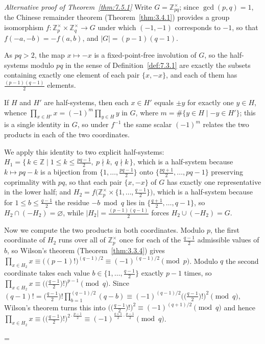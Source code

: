 \documentclass[11pt]{article}
\makeatletter
\theoremstyle{ntstyle}
\let\nt@closedisplay\]
\def\nt@guardedclose{\@ifnextchar\par{\nt@closeafterpar}{\@ifnextchar\end{\postdisplaypenalty\@M\nt@closedisplay}{\nt@closedisplay}}}
\def\nt@closeafterpar\par{\@ifnextchar\par{\nt@closeafterpar}{\@ifnextchar\end{\postdisplaypenalty\@M\nt@closedisplay\par}{\nt@closedisplay\par}}}
\renewenvironment{proof}[1][\proofname]{\par
  \pushQED{\qed}\normalfont\topsep\medskipamount\edef\nt@afterproof{\@endparpenalty=\the\@endparpenalty\relax}\@beginparpenalty\@M\@endparpenalty\@M\let\]\nt@guardedclose\trivlist\item[]\textit{#1\@addpunct{.}} \ignorespaces}{\ifvmode\addpenalty\@M\fi\popQED\nt@afterproof\endtrivlist\@endpefalse}
\newenvironment{altproof}[1][\proofname]{\begin{proof}[#1]\renewcommand{\qedsymbol}{}}{\end{proof}}
\newcommand{\ZmodUnits}[1]{\mathbb{Z}_{#1}^{\times}}
\makeatother
\begin{document}
\begin{altproof}[Alternative proof of Theorem~\ref{thm:7.5.1}] Write $G = \ZmodUnits{pq}$; since $\gcd(p, q)
		= 1$, the Chinese remainder theorem (Theorem~\ref{thm:3.4.1}) provides a group
	isomorphism $f : \ZmodUnits{p} \times \ZmodUnits{q}
		\to G$ under which $(-1, -1)$ corresponds to $-1$, so that $f(-a, -b)
		= -f(a, b)$, and $|G| = (p-1)(q-1)$.

	As $pq > 2$, the map $x \mapsto
		-x$ is a fixed-point-free involution of $G$, so the half-systems modulo
	$pq$ in the sense of Definition~\ref{def:7.3.1} are exactly the subsets containing
	exactly one element of each pair $\{x, -x\}$, and each of them has
	$\tfrac{(p-1)(q-1)}{2}$ elements.

	If $H$ and $H'$
	are half-systems, then each $x \in H'$ equals $\pm y$ for exactly one
	$y \in H$, whence $\prod_{x \in H'} x = (-1)^{m} \prod_{y \in H} y$ in
	$G$, where $m = \#\{y \in H \mid -y \in H'\}$; this is a single
	identity in $G$, so under $f^{-1}$ the same scalar $(-1)^{m}$ relates
	the two products in each of the two coordinates.

	We apply this identity to two explicit
	half-systems: $H_1 = \{\, k \in \mathbb{Z} \mid 1 \le k \le
		\tfrac{pq-1}{2},\ p \nmid k,\ q \nmid k \,\}$, which is a half-system
	because $k \mapsto pq - k$ is a bijection from $\{1, \ldots,
		\tfrac{pq-1}{2}\}$ onto $\{\tfrac{pq+1}{2}, \ldots, pq-1\}$
	preserving coprimality with $pq$, so that each pair $\{x, -x\}$ of $G$
	has exactly one representative in the lower half; and $H_2 =
		f\big(\ZmodUnits{p} \times \{1, \ldots,
		\tfrac{q-1}{2}\}\big)$, which is a half-system because for $1 \le b
		\le \tfrac{q-1}{2}$ the residue $-b \bmod q$ lies in
	$\{\tfrac{q+1}{2}, \ldots, q-1\}$, so $H_2 \cap (-H_2) = \varnothing$,
	while $|H_2| = \tfrac{(p-1)(q-1)}{2}$ forces $H_2 \cup (-H_2) = G$.

	Now we compute the two products in both coordinates. Modulo $p$, the
	first coordinate of $H_2$ runs over all of $\ZmodUnits{p}$
	once for each of the $\tfrac{q-1}{2}$ admissible values of $b$, so
	Wilson's theorem (Theorem~\ref{thm:3.3.4}) gives $\prod_{x \in H_2} x \equiv
		\big((p-1)!\big)^{(q-1)/2} \equiv (-1)^{(q-1)/2} \pmod{p}$. Modulo $q$
	the second coordinate takes each value $b \in \{1, \ldots,
		\tfrac{q-1}{2}\}$ exactly $p-1$ times, so $\prod_{x \in H_2} x \equiv
		\big(\big(\tfrac{q-1}{2}\big)!\big)^{p-1} \pmod{q}$. Since
	$(q-1)! = \big(\tfrac{q-1}{2}\big)! \prod_{b=1}^{(q-1)/2}(q - b)
		\equiv (-1)^{(q-1)/2}\big(\big(\tfrac{q-1}{2}\big)!\big)^{2}
		\pmod{q}$, Wilson's theorem turns this into
	$\big(\big(\tfrac{q-1}{2}\big)!\big)^{2} \equiv (-1)^{(q+1)/2}
		\pmod{q}$ and hence $\prod_{x \in H_2} x \equiv
		\big(\big(\tfrac{q-1}{2}\big)!\big)^{2 \cdot \frac{p-1}{2}} \equiv
		(-1)^{\frac{q+1}{2}\cdot\frac{p-1}{2}} \pmod{q}$.


\end{altproof}
\end{document}
